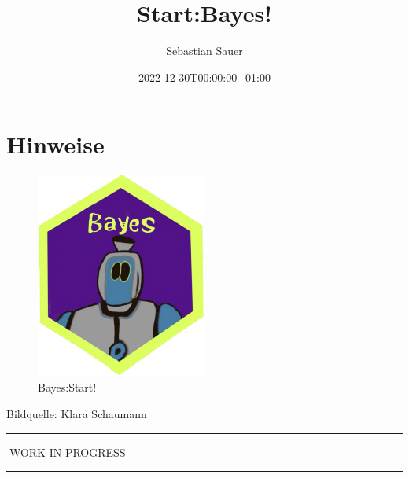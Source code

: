 \documentclass[
  a4paper,
  DIV=11]{scrreprt}
\title{Start:Bayes!}
\author{Sebastian Sauer}
\date{2022-12-30T00:00:00+01:00}
\renewcommand*\contentsname{Inhaltsverzeichnis}
\newcommand\contentsname{Inhaltsverzeichnis}
\theoremstyle{definition}
\theoremstyle{remark}
\begin{document}
\maketitle
\ifdefined\Shaded\renewenvironment{Shaded}{\begin{tcolorbox}[sharp corners, boxrule=0pt, frame hidden, borderline west={3pt}{0pt}{shadecolor}, enhanced, interior hidden, breakable]}{\end{tcolorbox}}\fi

\renewcommand*\contentsname{Inhaltsverzeichnis}
{
\hypersetup{linkcolor=}
\setcounter{tocdepth}{2}
\tableofcontents
}

\hypertarget{hinweise}{%
\chapter*{Hinweise}\label{hinweise}}

\begin{figure}

{\centering \includegraphics[width=0.5\textwidth,height=\textheight]{./img/Golem_hex.png}

}

\caption{Bayes:Start!}

\end{figure}

Bildquelle: Klara Schaumann

\begin{center}\rule{0.5\linewidth}{0.5pt}\end{center}

🚧WORK IN PROGRESS🚧

\begin{center}\rule{0.5\linewidth}{0.5pt}\end{center}
\end{document}
